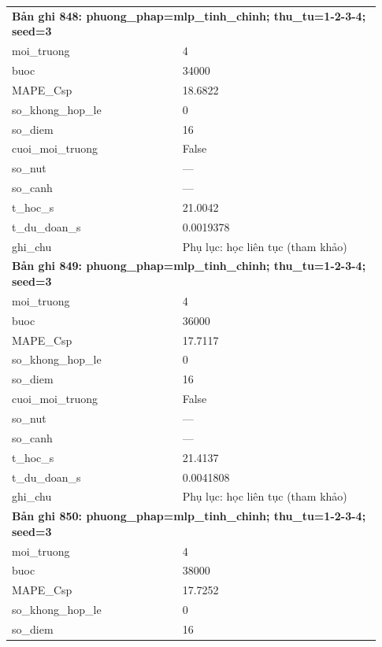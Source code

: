 \begin{longtable}{p{0.43\linewidth}p{0.50\linewidth}}
\midrule
\multicolumn{2}{p{0.95\linewidth}}{\textbf{Bản ghi 848: phuong\_phap=mlp\_tinh\_chinh; thu\_tu=1-2-3-4; seed=3}} \\
moi\_\allowbreak truong & 4 \\
buoc & 34000 \\
MAPE\_\allowbreak Csp & 18.6822 \\
so\_\allowbreak khong\_\allowbreak hop\_\allowbreak le & 0 \\
so\_\allowbreak diem & 16 \\
cuoi\_\allowbreak moi\_\allowbreak truong & False \\
so\_\allowbreak nut & — \\
so\_\allowbreak canh & — \\
t\_\allowbreak hoc\_\allowbreak s & 21.0042 \\
t\_\allowbreak du\_\allowbreak doan\_\allowbreak s & 0.0019378 \\
ghi\_\allowbreak chu & Phụ lục: học liên tục (tham khảo) \\
\midrule
\multicolumn{2}{p{0.95\linewidth}}{\textbf{Bản ghi 849: phuong\_phap=mlp\_tinh\_chinh; thu\_tu=1-2-3-4; seed=3}} \\
moi\_\allowbreak truong & 4 \\
buoc & 36000 \\
MAPE\_\allowbreak Csp & 17.7117 \\
so\_\allowbreak khong\_\allowbreak hop\_\allowbreak le & 0 \\
so\_\allowbreak diem & 16 \\
cuoi\_\allowbreak moi\_\allowbreak truong & False \\
so\_\allowbreak nut & — \\
so\_\allowbreak canh & — \\
t\_\allowbreak hoc\_\allowbreak s & 21.4137 \\
t\_\allowbreak du\_\allowbreak doan\_\allowbreak s & 0.0041808 \\
ghi\_\allowbreak chu & Phụ lục: học liên tục (tham khảo) \\
\midrule
\multicolumn{2}{p{0.95\linewidth}}{\textbf{Bản ghi 850: phuong\_phap=mlp\_tinh\_chinh; thu\_tu=1-2-3-4; seed=3}} \\
moi\_\allowbreak truong & 4 \\
buoc & 38000 \\
MAPE\_\allowbreak Csp & 17.7252 \\
so\_\allowbreak khong\_\allowbreak hop\_\allowbreak le & 0 \\
so\_\allowbreak diem & 16 \\

\end{longtable}
